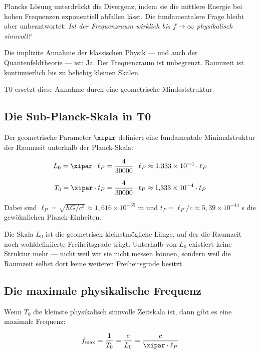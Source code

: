 Plancks Lösung unterdrückt die Divergenz, indem sie die mittlere Energie bei hohen 
Frequenzen exponentiell abfallen lässt. Die fundamentalere Frage bleibt aber 
unbeantwortet: \emph{Ist der Frequenzraum wirklich bis $f \to \infty$ physikalisch 
sinnvoll?}

Die implizite Annahme der klassischen Physik — und auch der Quantenfeldtheorie — 
ist: Ja. Der Frequenzraum ist unbegrenzt. Raumzeit ist kontinuierlich bis zu 
beliebig kleinen Skalen.

T0 ersetzt diese Annahme durch eine geometrische Mindeststruktur.

\subsection{Die Sub-Planck-Skala in T0}

Der geometrische Parameter $\xipar$ definiert eine fundamentale Minimalstruktur der 
Raumzeit unterhalb der Planck-Skala:

\begin{equation}
    L_0 = \xipar \cdot \ell_P = \frac{4}{30000} \cdot \ell_P \approx 1{,}333 \times 10^{-4} \cdot \ell_P
    \label{eq:subplanck_length}
\end{equation}

\begin{equation}
    T_0 = \xipar \cdot t_P = \frac{4}{30000} \cdot t_P \approx 1{,}333 \times 10^{-4} \cdot t_P
    \label{eq:subplanck_time}
\end{equation}

Dabei sind $\ell_P = \sqrt{\hbar G/c^3} \approx 1{,}616 \times 10^{-35}$ m und 
$t_P = \ell_P/c \approx 5{,}39 \times 10^{-44}$ s die gewöhnlichen Planck-Einheiten.

Die Skala $L_0$ ist die geometrisch kleinstmögliche Länge, auf der die Raumzeit 
noch wohldefiniierte Freiheitsgrade trägt. Unterhalb von $L_0$ existiert keine 
Struktur mehr — nicht weil wir sie nicht messen können, sondern weil die Raumzeit 
selbst dort keine weiteren Freiheitsgrade besitzt.

\subsection{Die maximale physikalische Frequenz}

Wenn $T_0$ die kleinste physikalisch sinnvolle Zeitskala ist, dann gibt es eine 
maximale Frequenz:

\begin{equation}
    f_{\max} = \frac{1}{T_0} = \frac{c}{L_0} = \frac{c}{\xipar \cdot \ell_P}
    \label{eq:f_max}
\end{equation}

